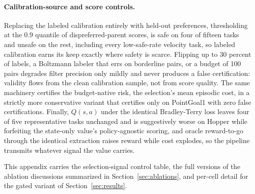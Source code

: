 \documentclass{article} %
\begin{document}
\paragraph{Calibration-source and score controls.} Replacing the labeled calibration entirely with held-out preferences, thresholding at the $0.9$ quantile of dispreferred-parent scores, is safe on four of fifteen tasks and unsafe on the rest, including every low-safe-rate velocity task, so labeled calibration earns its keep exactly where safety is scarce. Flipping up to 30 percent of labels, a Boltzmann labeler that errs on borderline pairs, or a budget of 100 pairs degrades filter precision only mildly and never produces a false certification: validity flows from the clean calibration sample, not from score quality. The same machinery certifies the budget-native risk, the selection's mean episodic cost, in a strictly more conservative variant that certifies only on PointGoal1 with zero false certifications. Finally, $Q(s, a)$ under the identical Bradley-Terry loss leaves four of five representative tasks unchanged and is suggestively worse on Hopper while forfeiting the state-only value's policy-agnostic scoring, and oracle reward-to-go through the identical extraction raises reward while cost explodes, so the pipeline transmits whatever signal the value carries.

This appendix carries the selection-signal control table, the full versions of the ablation discussions summarized in Section~\ref{sec:ablations}, and per-cell detail for the gated variant of Section~\ref{sec:results}.
\end{document}
